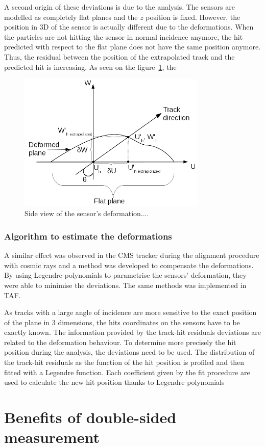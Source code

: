       A second origin of these deviations is due to the analysis.
      The sensors are modelled as completely flat planes and the $z$ position is fixed.
      However, the position in 3D of the sensor is actually different due to the deformations.
      When the particles are not hitting the sensor in normal incidence anymore, the hit predicted with respect to the flat plane does not have the same position anymore.
      Thus, the residual between the position of the extrapolated track and the predicted hit is increasing.
      As seen on the figure~\ref{fig:originDef}, the 

      \begin{figure}[!h]
      \centering
        \includegraphics[width = 0.8\textwidth]{Pictures/deformation/origin_deformation.png}
        \caption{Side view of the sensor's deformation....}
        \label{fig:originDef}
      \end{figure}

      \subsubsection{Algorithm to estimate the deformations}

      A similar effect was observed in the CMS tracker during the alignment procedure with cosmic rays and a method was developed to compensate the deformations\cite{CMSalignment}. 
      By using Legendre polynomials to parametrise the sensors' deformation, they were able to minimise the deviations.
      The same methods was implemented in TAF.

      As tracks with a large angle of incidence are more sensitive to the exact position of the plane in 3 dimensions, the hits coordinates on the sensors have to be exactly known. 
      The information provided by the track-hit residuals deviations are related to the deformation behaviour. 
      To determine more precisely the hit position during the analysis, the deviations need to be used. 
      The distribution of the track-hit residuals as the function of the hit position is profiled and then fitted with a Legendre function. 
      Each coefficient given by the fit procedure are used to calculate the new hit position thanks to Legendre polynomials

      \begin{figure}
      \end{figure}
    
  \section{Benefits of double-sided measurement}

